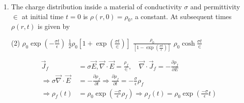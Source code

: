 \begin{enumerate}
	{}
	\begin{tasks}(4)
		\task[\textbf{A.}] $a k r^{2} e^{-a t}$
		\task[\textbf{B.}] $2 a k r^{2} e^{-a t}$
		\task[\textbf{C.}] $-a k r^{2} e^{-a t}$
		\task[\textbf{D.}] $-2 a k r^{2} e^{-a t}$
	\end{tasks}
\begin{answer}
	\begin{align*}
	\intertext{Gauge TransformationGauge Transformation}
	\vec{A}&=\vec{A}+\vec{\nabla} \lambda, \phi^{\prime}=\phi-\frac{\partial \lambda}{\partial t} \Rightarrow \vec{A}-\vec{A}\\&=-2 k e^{-a t} r \hat{r}=\vec{\nabla} \lambda=\frac{\partial \lambda}{\partial r} \hat{r}\\
	\Rightarrow \lambda&=-k e^{-a t} r^{2} \Rightarrow \frac{\partial \lambda}{\partial t}=k a e^{-a t} r^{2}\\
	\Rightarrow \phi^{\prime}-\phi&=-\frac{\partial \lambda}{\partial t}=-k a e^{-a t} r^{2}
	\end{align*}
	So the correct answer is \textbf{Option (C)}
\end{answer}
	\item  The charge distribution inside a material of conductivity $\sigma$ and permittivity $\in$ at initial time $t=0$ is $\rho(r, 0)=\rho_{0}$, a constant. At subsequent times $\rho(r, t)$ is given by
	{}
	\begin{tasks}(2)
		\task[\textbf{A.}]  $\rho_{0} \exp \left(-\frac{\sigma t}{\epsilon}\right)$
		\task[\textbf{B.}] $\frac{1}{2} \rho_{0}\left[1+\exp \left(\frac{\sigma t}{\in}\right)\right]$
		\task[\textbf{C.}]  $\frac{\rho_{0}}{\left[1-\exp \left(\frac{\sigma t}{\epsilon}\right)\right]}$
		\task[\textbf{D.}] $\rho_{0} \cosh \frac{\sigma t}{\in}$
	\end{tasks}
\begin{answer}
	\begin{align*}
	\vec{J}_{f}&=\sigma \vec{E}, \vec{\nabla} \cdot \vec{E}=\frac{\rho_{f}}{\in}, \quad \vec{\nabla} \cdot \vec{J}_{f}=-\frac{\partial \rho_{f}}{\partial E}\\
	\Rightarrow \sigma \vec{\nabla} \cdot \vec{E}&=-\frac{\partial \rho_{f}}{\partial t} \Rightarrow \frac{\partial \rho_{f}}{\partial t}=-\frac{\sigma}{\epsilon} \rho_{f}\\
	\Rightarrow \rho_{f}(t)&=\rho_{0} \exp \left(\frac{-\sigma}{\epsilon} \rho_{f}\right) \Rightarrow \rho_{f}(t)=\rho_{0} \exp \left(\frac{-\sigma}{\epsilon} t\right)
	\end{align*}

\end{answer}
\end{enumerate}
